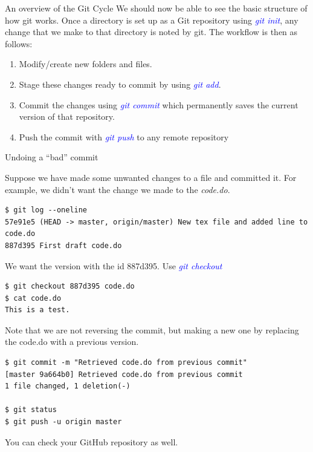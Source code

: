 \documentclass[11pt]{beamer}
\begin{document}
\begin{frame}[fragile]{An overview of the Git Cycle}
We should now be able to see the basic structure of how git works. Once a directory is set up as a Git repository using \textcolor{blue}{\emph{git init}}, any change that we make to that directory is noted by git. The workflow is then as follows:
\begin{enumerate}
	\item
	Modify/create new folders and files.
	\item
	Stage these changes ready to commit by using \textcolor{blue}{\emph{git add}}.
	\item
	Commit the changes using \textcolor{blue}{\emph{git commit}} which permanently saves the current version of that repository.
	\item
	Push the commit with \textcolor{blue}{\emph{git push}} to any remote repository
\end{enumerate}
\end{frame}
\begin{frame}[fragile]{Undoing a ``bad'' commit}

Suppose we have made some unwanted changes to a file and committed it. For example, we didn't want the change we made to the \emph{code.do}.

\begin{lstlisting}
$ git log --oneline
57e91e5 (HEAD -> master, origin/master) New tex file and added line to code.do
887d395 First draft code.do
\end{lstlisting}

We want the version with the id 887d395. Use \textcolor{blue}{\emph{git checkout}}
\begin{lstlisting}
$ git checkout 887d395 code.do
$ cat code.do
This is a test.
\end{lstlisting}


Note that we are not reversing the commit, but making a new one by replacing the code.do with a previous version.

\begin{lstlisting}
$ git commit -m "Retrieved code.do from previous commit"
[master 9a664b0] Retrieved code.do from previous commit
1 file changed, 1 deletion(-)

$ git status
$ git push -u origin master
\end{lstlisting}
You can check your GitHub repository as well.
\end{frame}
\end{document}
